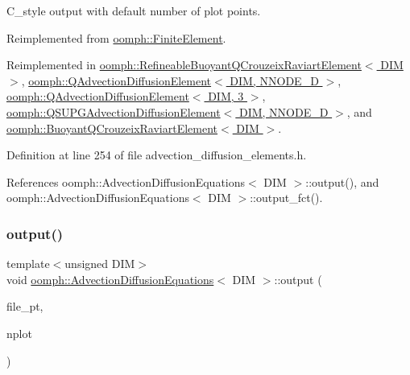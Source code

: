 C\+\_\+style output with default number of plot points. 



Reimplemented from \hyperlink{classoomph_1_1FiniteElement_a72cddd09f8ddbee1a20a1ff404c6943e}{oomph\+::\+Finite\+Element}.



Reimplemented in \hyperlink{classoomph_1_1RefineableBuoyantQCrouzeixRaviartElement_a90579086f991da7fbaf7d92b29abf994}{oomph\+::\+Refineable\+Buoyant\+Q\+Crouzeix\+Raviart\+Element$<$ D\+I\+M $>$}, \hyperlink{classoomph_1_1QAdvectionDiffusionElement_a792f83bb2d8c22365cce60c43853396c}{oomph\+::\+Q\+Advection\+Diffusion\+Element$<$ D\+I\+M, N\+N\+O\+D\+E\+\_\+D $>$}, \hyperlink{classoomph_1_1QAdvectionDiffusionElement_a792f83bb2d8c22365cce60c43853396c}{oomph\+::\+Q\+Advection\+Diffusion\+Element$<$ D\+I\+M, 3 $>$}, \hyperlink{classoomph_1_1QSUPGAdvectionDiffusionElement_a57517d0b9c06ffee384f70fe587076c2}{oomph\+::\+Q\+S\+U\+P\+G\+Advection\+Diffusion\+Element$<$ D\+I\+M, N\+N\+O\+D\+E\+\_\+D $>$}, and \hyperlink{classoomph_1_1BuoyantQCrouzeixRaviartElement_a9ba77409f12b80862262f6695829055b}{oomph\+::\+Buoyant\+Q\+Crouzeix\+Raviart\+Element$<$ D\+I\+M $>$}.



Definition at line 254 of file advection\+\_\+diffusion\+\_\+elements.\+h.



References oomph\+::\+Advection\+Diffusion\+Equations$<$ D\+I\+M $>$\+::output(), and oomph\+::\+Advection\+Diffusion\+Equations$<$ D\+I\+M $>$\+::output\+\_\+fct().

\mbox{\label{classoomph_1_1AdvectionDiffusionEquations_a03a096ff864ee53c8823b08e0d2f6091}} 
\subsubsection{\texorpdfstring{output()}{output()}\hspace{0.1cm}{\footnotesize\ttfamily [4/4]}}
{\footnotesize\ttfamily template$<$unsigned D\+IM$>$ \\
void \hyperlink{classoomph_1_1AdvectionDiffusionEquations}{oomph\+::\+Advection\+Diffusion\+Equations}$<$ D\+IM $>$\+::output (\begin{DoxyParamCaption}\item[{F\+I\+LE $\ast$}]{file\+\_\+pt,  }\item[{const unsigned \&}]{nplot }\end{DoxyParamCaption})\hspace{0.3cm}{\ttfamily [virtual]}}



